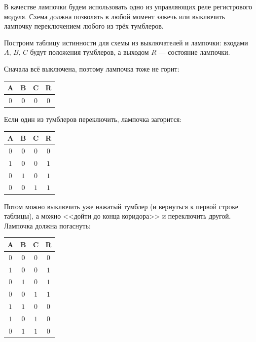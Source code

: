 В качестве лампочки будем использовать одно из управляющих реле регистрового модуля.
Схема должна позволять в любой момент зажечь или выключить лампочку переключением любого
из трёх тумблеров.

Построим таблицу истинности для схемы из выключателей и лампочки: входами $A$, $B$, $C$ будут
положения тумблеров, а выходом $R$ --- состояние лампочки.

Сначала всё выключена, поэтому лампочка тоже не горит:

\begin{center}
\begin{tabular}{|c|c|c|c|}
 \hline
 \textbf{A} & \textbf{B} & \textbf{C} & \textbf{R} \\ \hline
 $0$ & $0$ & $0$ & $0$ \\ \hline
\end{tabular}
\end{center}

Если один из тумблеров переключить, лампочка загорится:

\begin{center}
\begin{tabular}{|c|c|c|c|}
 \hline
 \textbf{A} & \textbf{B} & \textbf{C} & \textbf{R} \\ \hline
 $0$ & $0$ & $0$ & $0$ \\ \hline
 $1$ & $0$ & $0$ & $1$ \\ \hline
 $0$ & $1$ & $0$ & $1$ \\ \hline
 $0$ & $0$ & $1$ & $1$ \\ \hline
\end{tabular}
\end{center}

Потом можно выключить уже нажатый тумблер (и вернуться к первой строке таблицы),
а можно <<дойти до конца коридора>> и переключить другой. Лампочка должна погаснуть:

\begin{center}
\begin{tabular}{|c|c|c|c|}
 \hline
 \textbf{A} & \textbf{B} & \textbf{C} & \textbf{R} \\ \hline
 $0$ & $0$ & $0$ & $0$ \\ \hline
 $1$ & $0$ & $0$ & $1$ \\ \hline
 $0$ & $1$ & $0$ & $1$ \\ \hline
 $0$ & $0$ & $1$ & $1$ \\ \hline
 $1$ & $1$ & $0$ & $0$ \\ \hline
 $1$ & $0$ & $1$ & $0$ \\ \hline
 $0$ & $1$ & $1$ & $0$ \\ \hline
\end{tabular}
\end{center}

